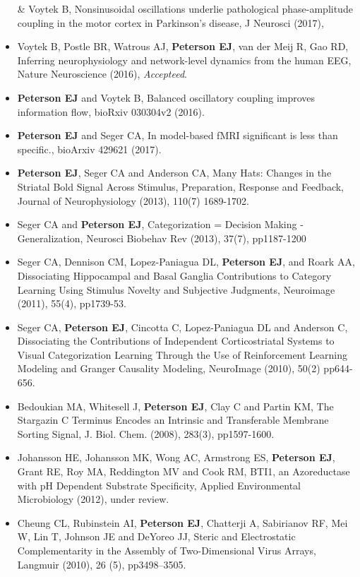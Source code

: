 \begin{itemize}
  \& Voytek B, Nonsinusoidal oscillations underlie pathological
  phase-amplitude coupling in the motor cortex in Parkinson's disease, J
  Neurosci (2017),
\item
  Voytek B, Postle BR, Watrous AJ, \textbf{Peterson EJ}, van der Meij R,
  Gao RD, Inferring neurophysiology and network-level dynamics from the
  human EEG, Nature Neuroscience (2016), \emph{Accepteed}.
\item
  \textbf{Peterson EJ} and Voytek B, Balanced oscillatory coupling
  improves information flow, bioRxiv 030304v2 (2016).
\item
  \textbf{Peterson EJ} and Seger CA, In model-based fMRI significant is
  less than specific., bioArxiv 429621 (2017).
\item
  \textbf{Peterson EJ}, Seger CA and Anderson CA, Many Hats: Changes in
  the Striatal Bold Signal Across Stimulus, Preparation, Response and
  Feedback, Journal of Neurophysiology (2013), 110(7) 1689-1702.
\item
  Seger CA and \textbf{Peterson EJ}, Categorization = Decision Making -
  Generalization, Neurosci Biobehav Rev (2013), 37(7), pp1187-1200
\item
  Seger CA, Dennison CM, Lopez-Paniagua DL, \textbf{Peterson EJ}, and
  Roark AA, Dissociating Hippocampal and Basal Ganglia Contributions to
  Category Learning Using Stimulus Novelty and Subjective Judgments,
  Neuroimage (2011), 55(4), pp1739-53.
\item
  Seger CA, \textbf{Peterson EJ}, Cincotta C, Lopez-Paniagua DL and
  Anderson C, Dissociating the Contributions of Independent
  Corticostriatal Systems to Visual Categorization Learning Through the
  Use of Reinforcement Learning Modeling and Granger Causality Modeling,
  NeuroImage (2010), 50(2) pp644-656.
\item
  Bedoukian MA, Whitesell J, \textbf{Peterson EJ}, Clay C and Partin KM,
  The Stargazin C Terminus Encodes an Intrinsic and Transferable
  Membrane Sorting Signal, J. Biol. Chem. (2008), 283(3), pp1597-1600.
\item
  Johansson HE, Johansson MK, Wong AC, Armstrong ES, \textbf{Peterson
  EJ}, Grant RE, Roy MA, Reddington MV and Cook RM, BTI1, an
  Azoreductase with pH Dependent Substrate Specificity, Applied
  Environmental Microbiology (2012), under review.
\item
  Cheung CL, Rubinstein AI, \textbf{Peterson EJ}, Chatterji A,
  Sabirianov RF, Mei W, Lin T, Johnson JE and DeYoreo JJ, Steric and
  Electrostatic Complementarity in the Assembly of Two-Dimensional Virus
  Arrays, Langmuir (2010), 26 (5), pp3498--3505.
\end{itemize}

